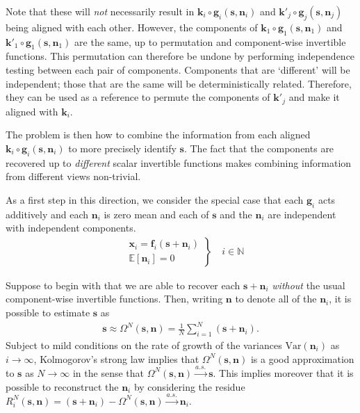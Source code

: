 Note that these will \emph{not} necessarily result in  $\bm{k}_i\circ\bm{g}_i(\bm{s},\bm{n}_i)$ and $\bm{k}'_j\circ\bm{g}_j(\bm{s},\bm{n}_j)$ being aligned with each other.
However, the components of $\bm{k}_1\circ\bm{g}_1(\bm{s},\bm{n}_1)$ and $\bm{k}'_1\circ\bm{g}_1(\bm{s},\bm{n}_1)$ are the same, up to permutation and component-wise invertible functions.
This permutation can therefore be undone by performing independence testing between each pair of components.
Components that are `different' will be independent; those that are the same will be deterministically related.
Therefore, they can be used as a reference to permute the components of $\bm{k}'_j$ and make it aligned with $\bm{k}_i$.

The problem is then how to combine the information from each aligned $\bm{k}_i \circ \bm{g}_i(\bm{s},\bm{n}_i)$ to more precisely identify $\bm{s}$.
The fact that the components are recovered up to \emph{different} scalar invertible functions makes combining information from different views non-trivial.


As a first step in this direction, we consider the special case that each $\bm{g}_i$ acts additively and each $\bm{n}_i$ is zero mean and each of $\bm{s}$ and the $\bm{n}_i$ are independent with independent components.
\begin{align}
\left.
\begin{array}{ll}
&\bm{x}_{i}=\bm{f}_{i}(\bm{s} + \bm{n}_{i}) \\
&\mathbb{E}[\bm{n}_i]= 0
\end{array}
\right\rbrace \quad i \in \mathbb{N}
\end{align}

Suppose to begin with that we are able to recover each $\bm{s} + \bm{n}_i$ \emph{without} the usual component-wise invertible functions. Then, writing $\bm{n}$ to denote all of the $\bm{n}_i$, it is possible to estimate $\bm{s}$ as
\begin{align*}
\bm{s} \approx \Omega^N(\bm{s}, \bm{n}) = \frac{1}{N}\sum_{i=1}^N \left(\bm{s} + \bm{n}_i\right).
\end{align*}
Subject to mild conditions on the rate of growth of the variances $\text{Var}(\bm{n}_i)$ as $i\to\infty$, Kolmogorov's strong law implies that $\Omega^N(\bm{s}, \bm{n})$ is a good approximation to $\bm{s}$ as $N\to\infty$ in the sense that  $\Omega^N(\bm{s}, \bm{n}) \overset{a.s.}{\longrightarrow} \bm{s}$.
This implies moreover that it is possible to reconstruct the $\bm{n}_i$ by considering the residue $R^N_i(\bm{s}, \bm{n}) = (\bm{s} + \bm{n}_i) - \Omega^N(\bm{s}, \bm{n}) \overset{a.s.}{\longrightarrow} \bm{n}_i$.

